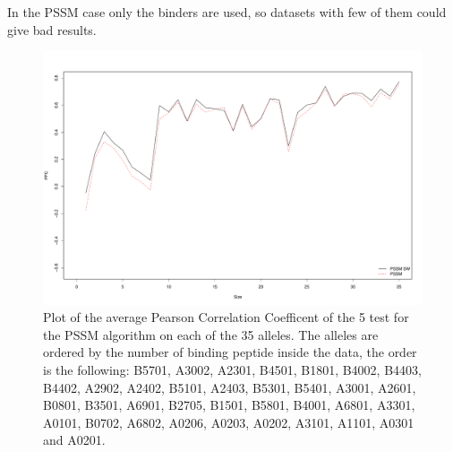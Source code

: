 In the PSSM case only the binders are used, so datasets with few of them could give bad results.

\begin{figure}[ht]
\begin{center}
\includegraphics[width=18cm]{fig/pssmLN1.pdf}
\caption{Plot of the average Pearson Correlation Coefficent of the 5 test for the PSSM algorithm on each of the 35 alleles. The alleles are ordered by the number of binding peptide inside the data, the order is the following:
B5701, A3002, A2301, B4501, B1801, B4002, B4403, B4402, A2902, A2402, B5101, A2403, B5301, B5401, A3001, A2601, B0801, B3501, A6901, B2705, B1501, B5801, B4001, A6801, A3301, A0101, B0702, A6802, A0206, A0203, A0202, A3101, A1101, A0301 and A0201.}\label{fig:pssm1}
\end{center}
\end{figure}

